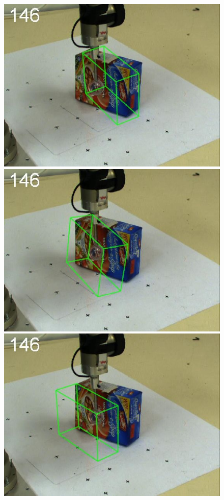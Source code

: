 \begin{figure}[tbp]
{}
\centerline{
\includegraphics[width=\imgCXwid]{images/C1_2exp_87_3}
\includegraphics[width=\imgCXwid]{images/C1_1exp_87_3}
\includegraphics[width=\imgCXwid]{images/C1_LWPR1_87_3}
}
\end{figure}
